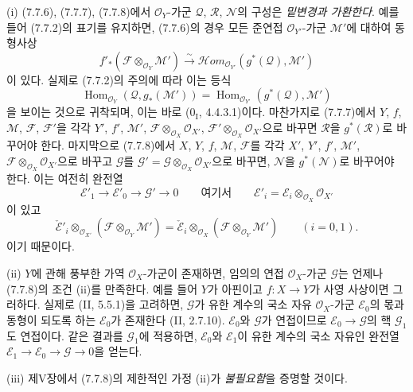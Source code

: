 \begin{remarks}[7.7.9]
\textnormal{(i)} (7.7.6), (7.7.7), (7.7.8)에서
$\mathscr O_Y$-가군 $\mathscr Q$, $\mathscr R$, $\mathscr N$의 구성은
\emph{밑변경과 가환한다}. 예를 들어 (7.7.2)의 표기를 유지하면,
(7.7.6)의 경우 모든 준연접 $\mathscr O_{Y'}$-가군 $\mathscr M'$에
대하여 동형사상
\[
  f'_*(\mathscr F\otimes_{\mathscr O_Y}\mathscr M')
  \xrightarrow{\sim}
  \mathscr{H}\!om_{\mathscr O_{Y'}}(g^*(\mathscr Q),\mathscr M')
\]
이 있다. 실제로 (7.7.2)의 주의에 따라 이는 등식
\[
  \operatorname{Hom}_{\mathscr O_Y}(\mathscr Q,g_*(\mathscr M'))
  =
  \operatorname{Hom}_{\mathscr O_{Y'}}(g^*(\mathscr Q),\mathscr M')
\]
을 보이는 것으로 귀착되며, 이는 바로 ($0_{\mathrm I}$, 4.4.3.1)이다.
마찬가지로 (7.7.7)에서 $Y$, $f$, $\mathscr M$, $\mathscr F$,
$\mathscr F'$을 각각 $Y'$, $f'$, $\mathscr M'$,
$\mathscr F\otimes_{\mathscr O_X}\mathscr O_{X'}$,
$\mathscr F'\otimes_{\mathscr O_X}\mathscr O_{X'}$으로 바꾸면
$\mathscr R$을 $g^*(\mathscr R)$로 바꾸어야 한다. 마지막으로 (7.7.8)에서
$X$, $Y$, $f$, $\mathscr M$, $\mathscr F$를 각각 $X'$, $Y'$, $f'$,
$\mathscr M'$, $\mathscr F\otimes_{\mathscr O_X}\mathscr O_{X'}$으로
바꾸고 $\mathscr G$를
$\mathscr G'=\mathscr G\otimes_{\mathscr O_X}\mathscr O_{X'}$으로 바꾸면,
$\mathscr N$을 $g^*(\mathscr N)$로 바꾸어야 한다. 이는 여전히 완전열
\[
  \mathscr E'_1\longrightarrow
  \mathscr E'_0\longrightarrow
  \mathscr G'\longrightarrow0
  \qquad\text{여기서}\qquad
  \mathscr E'_i=\mathscr E_i\otimes_{\mathscr O_X}\mathscr O_{X'}
\]
이 있고
\[
  \check{\mathscr E}'_i
  \otimes_{\mathscr O_{X'}}
  (\mathscr F\otimes_{\mathscr O_Y}\mathscr M')
  =
  \check{\mathscr E}_i
  \otimes_{\mathscr O_X}
  (\mathscr F\otimes_{\mathscr O_Y}\mathscr M')
  \qquad(i=0,1).
\]
이기 때문이다.

\medskip
\textnormal{(ii)} $Y$에 관해 풍부한 가역 $\mathscr O_X$-가군이 존재하면,
임의의 연접 $\mathscr O_X$-가군 $\mathscr G$는 언제나 (7.7.8)의 조건
(ii)를 만족한다. 예를 들어 $Y$가 아핀이고 $f:X\to Y$가 사영 사상이면
그러하다. 실제로 (II, 5.5.1)을 고려하면, $\mathscr G$가 유한 계수의
국소 자유 $\mathscr O_X$-가군 $\mathscr E_0$의 몫과 동형이 되도록 하는
$\mathscr E_0$가 존재한다 (II, 2.7.10). $\mathscr E_0$와 $\mathscr G$가
연접이므로 $\mathscr E_0\to\mathscr G$의 핵 $\mathscr G_1$도 연접이다.
같은 결과를 $\mathscr G_1$에 적용하면, $\mathscr E_0$와
$\mathscr E_1$이 유한 계수의 국소 자유인 완전열
$\mathscr E_1\to\mathscr E_0\to\mathscr G\to0$을 얻는다.

\medskip
\textnormal{(iii)} 제V장에서 (7.7.8)의 제한적인 가정 (ii)가
\emph{불필요함}을 증명할 것이다.
\end{remarks}

